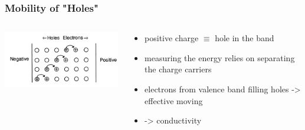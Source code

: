 \documentclass[aspectratio=1610, 9pt]{beamer}
\begin{document}
\begin{frame}\frametitle{Mobility of "Holes"}
  \begin{columns}
    \begin{column}[c]{0.48\textwidth}
      \includegraphics[width=\textwidth]{plots/holes.png}
    \end{column}
    \begin{column}[c]{0.48\textwidth}
      \begin{itemize}
        \item positive charge $\equiv$ hole in the band
        \item measuring the energy relies on separating the charge carriers
        \item electrons from valence band filling holes -> effective moving
        \item -> conductivity
      \end{itemize}
    \end{column}
  \end{columns}
\end{frame}
\end{document}
